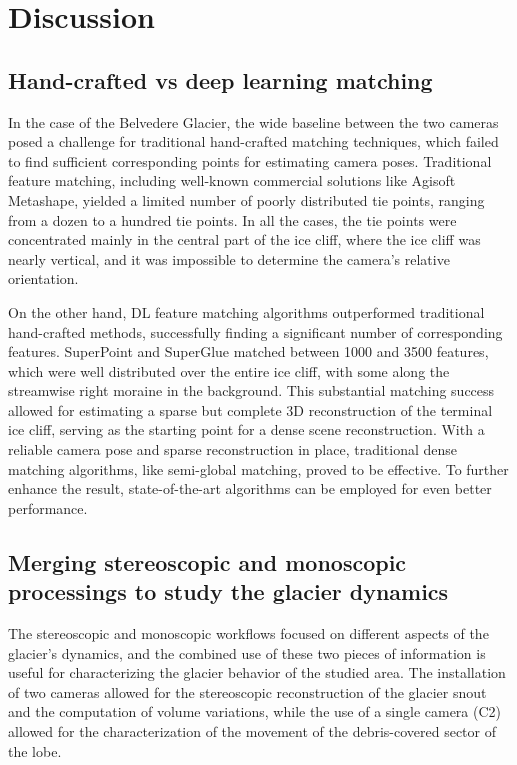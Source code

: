 \section{Discussion}
\label{sec:4:discussion}

\subsection{Hand-crafted vs deep learning matching}\label{sec:4:handcrafted_vs_dl}

In the case of the Belvedere Glacier, the wide baseline between the two cameras posed a challenge for traditional hand-crafted matching techniques, which failed to find
sufficient corresponding points for estimating camera poses. 
Traditional feature matching, including well-known commercial solutions like Agisoft Metashape, yielded a limited number of poorly distributed tie points, ranging
from a dozen to a hundred tie points.
In all the cases, the tie points were concentrated mainly in the central part of the ice cliff, where the ice cliff was nearly vertical, and it was impossible to determine the camera's relative orientation.

On the other hand, DL feature matching algorithms outperformed traditional hand-crafted
methods, successfully finding a significant number of corresponding features.
SuperPoint and SuperGlue matched between 1000 and 3500 features, which were well distributed over the entire ice cliff, with some along the streamwise right moraine
in the background.
This substantial matching success allowed for estimating a sparse but complete 3D reconstruction of the terminal ice cliff, serving as the starting point for a
dense scene reconstruction.
With a reliable camera pose and sparse reconstruction in place, traditional dense matching algorithms, like semi-global matching, proved to be effective.
To further enhance the result, state-of-the-art algorithms can be employed for even better performance.

\subsection{Merging stereoscopic and monoscopic processings to study the glacier
  dynamics}\label{sec:4:stereo_monoscopic}

The stereoscopic and monoscopic workflows focused on different aspects of the glacier's dynamics, and the combined use of these two pieces of information is useful for characterizing the glacier behavior of the studied area.
The installation of two cameras allowed for the stereoscopic reconstruction of the glacier snout and the computation of volume variations, while the use of a single camera
(C2) allowed for the characterization of the movement of the debris-covered sector of the lobe.


